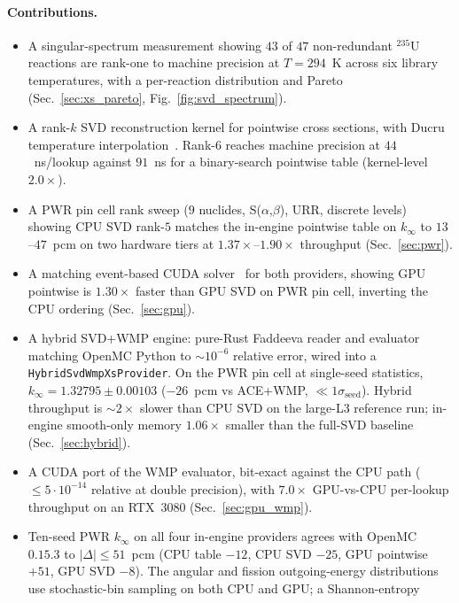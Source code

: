 \paragraph{Contributions.}
\begin{itemize}
\item A singular-spectrum measurement showing $43$ of $47$
  non-redundant $^{235}$U reactions are rank-one to machine
  precision at $T = 294$~K across six library temperatures,
  with a per-reaction distribution and Pareto
  (Sec.~\ref{sec:xs_pareto}, Fig.~\ref{fig:svd_spectrum}).
\item A rank-$k$ SVD reconstruction kernel for pointwise
  cross sections, with Ducru temperature
  interpolation~\cite{ducru2017}. Rank-$6$ reaches machine
  precision at $44$~ns/lookup against $91$~ns for a
  binary-search pointwise table (kernel-level $2.0\times$).
\item A PWR pin cell rank sweep ($9$ nuclides,
  S($\alpha$,$\beta$), URR, discrete levels) showing CPU SVD
  rank-$5$ matches the in-engine pointwise table on
  $k_\infty$ to $13$--$47$~pcm on two hardware tiers at
  $1.37\times$--$1.90\times$ throughput
  (Sec.~\ref{sec:pwr}).
\item A matching event-based CUDA solver~\cite{tramm2024} for
  both providers, showing GPU pointwise is $1.30\times$
  faster than GPU SVD on PWR pin cell, inverting the CPU
  ordering (Sec.~\ref{sec:gpu}).
\item A hybrid SVD+WMP engine: pure-Rust Faddeeva reader and
  evaluator matching OpenMC Python to $\sim\!10^{-6}$
  relative error, wired into a
  \texttt{HybridSvdWmpXsProvider}. On the PWR pin cell at
  single-seed statistics, $k_\infty = 1.32795 \pm 0.00103$
  ($-26$~pcm vs ACE+WMP, $\ll 1\sigma_\text{seed}$).
  Hybrid throughput is $\sim\!2\times$
  slower than CPU SVD on the large-L3 reference run;
  in-engine smooth-only memory $1.06\times$ smaller than the
  full-SVD baseline (Sec.~\ref{sec:hybrid}).
\item A CUDA port of the WMP evaluator, bit-exact against the
  CPU path ($\leq 5 \cdot 10^{-14}$ relative at double
  precision), with $7.0\times$ GPU-vs-CPU per-lookup
  throughput on an RTX~$3080$
  (Sec.~\ref{sec:gpu_wmp}).
\item Ten-seed PWR $k_\infty$ on all four in-engine
  providers agrees with OpenMC~$0.15.3$ to
  $|\Delta| \le 51$~pcm (CPU table $-12$, CPU SVD $-25$,
  GPU pointwise $+51$, GPU SVD $-8$). The angular and
  fission outgoing-energy distributions use stochastic-bin
  sampling on both CPU and GPU; a Shannon-entropy

\end{itemize}
